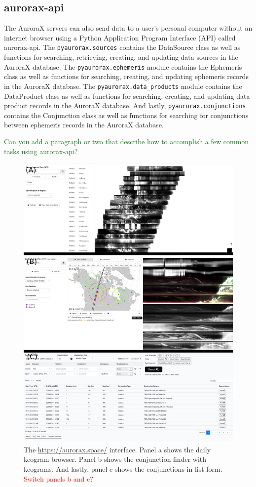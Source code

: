 \documentclass[draft]{agujournal2019}
\begin{document}
\subsection{aurorax-api}
The AuroraX servers can also send data to a user's personal computer without an internet browser using a Python Application Program Interface (API) called aurorax-api. The \verb|pyaurorax.sources| contains the DataSource class as well as functions for searching, retrieving, creating, and updating data sources in the AuroraX database. The \verb|pyaurorax.ephemeris| module contains the Ephemeris class as well as functions for searching, creating, and updating ephemeris records in the AuroraX database. The \verb|pyaurorax.data_products| module contains the DataProduct class as well as functions for searching, creating, and updating data product records in the AuroraX database. And lastly, \verb|pyaurorax.conjunctions| contains the Conjunction class as well as functions for searching for conjunctions between ephemeris records in the AuroraX database. 

\textcolor{green}{Can you add a paragraph or two that describe how to accomplish a few common tasks using aurorax-api?}

\begin{figure}
      \includegraphics[width=\textwidth]{figures/fig1.png}
      \caption{The \url{https://aurorax.space/} interface. Panel a shows the daily keogram browser. Panel b shows the conjunction finder with keograms. And lastly, panel c shows the conjunctions in list form. \textcolor{red}{Switch panels b and c?}}
      \label{fig1}
\end{figure}
\end{document}
